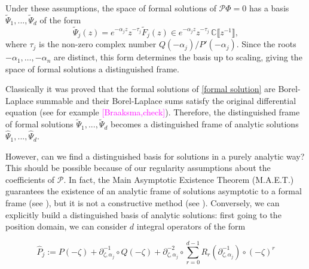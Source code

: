 \documentclass{article}
\theoremstyle{definition}
\newcommand{\C}{\mathbb{C}}
\newcommand{\series}[1]{\tilde{#1}}
\begin{document}
Under these assumptions, the space of formal solutions of $\mathcal{P}\Phi = 0$ has a basis $\series{\Psi}_1,...,\series{\Psi}_d$ of the form~\cite{int-irreg}\cite[Proposition~2.2.7, p.~111]{EcalleIII}
\begin{equation}\label{formal solution}
\series{\Psi}_j(z)=e^{-\alpha_j z}z^{-\tau_j}\series{F}_j(z)\in e^{-\alpha_j z } z^{-\tau_j}\,\C \llbracket z^{-1} \rrbracket,
\end{equation}
where $\tau_j$ is the non-zero complex number $Q(-\alpha_j)/P'(-\alpha_j)$. Since the roots $-\alpha_1, \ldots, -\alpha_n$ are distinct, this form determines the basis up to scaling, giving the space of formal solutions a distinguished frame.

Classically it was proved that the formal solutions of \eqref{formal solution} are Borel-Laplace summable and their Borel-Laplace sums satisfy the original differential equation (see for example \cite{ramis1991series,malgrange92,malgrange1995sommation,diverg-resurg--ii}\textcolor{magenta}{[Braaksma,check]}). Therefore, the distinguished frame of formal solutions $\series{\Psi}_1,...,\series{\Psi}_d$ becomes a distinguished frame of analytic solutions $\hat{\Psi}_1,...,\hat{\Psi}_d$.       

However, can we find a distinguished basis for solutions in a purely analytic way? This should be possible because of our regularity assumptions about the coefficients of $\mathcal{P}$. In fact, the Main Asymptotic Existence Theorem (M.A.E.T.) guarantees the existence of an analytic frame of solutions asymptotic to a formal frame (see \cite[Theorem 3.1]{diverg-resurg-iii}), but it is not a constructive method (see \cite[Chapter 14]{balser}). Conversely, we can explicitly build a distinguished basis of analytic solutions: first going to the position domain, we can consider $d$ integral operators of the form 

\begin{equation}
\hat{P}_j:=P(-\zeta)+\partial_{\zeta,\alpha_j}^{-1}\circ Q(-\zeta)+\partial_{\zeta,\alpha_j}^{-2}\circ\sum_{r=0}^{d-1}R_r(\partial_{\zeta,\alpha_j}^{-1})\circ (-\zeta)^r
\end{equation}
\end{document}
